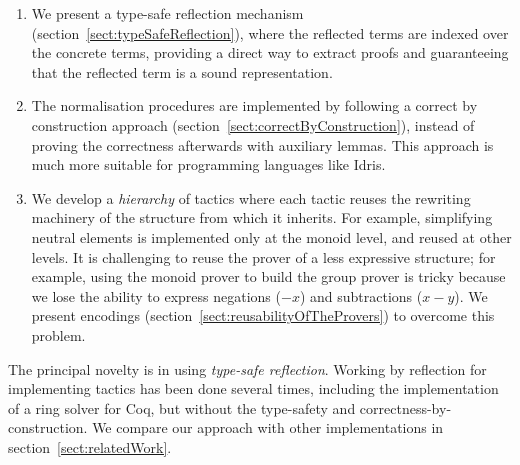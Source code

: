 \begin{enumerate}

\item We present a type-safe reflection mechanism
(section~\ref{sect:typeSafeReflection}), where the reflected terms are indexed
over the concrete terms, providing a direct way to extract proofs and
guaranteeing that the reflected term is a sound representation.

\item The normalisation procedures are implemented by following a correct by
construction approach (section~\ref{sect:correctByConstruction}), instead of proving the correctness afterwards with
auxiliary lemmas. This approach is much more suitable for programming languages
like Idris. 

\item We develop a \emph{hierarchy} of tactics where each tactic reuses the
rewriting machinery of the structure from which it inherits.  For
example, simplifying neutral elements is implemented only at the monoid level,
and reused at other levels.
It is challenging
to reuse the prover of a less expressive structure; for
example, using the monoid prover to build the group prover is 
tricky because
we lose the ability to express negations ($-x$) and
subtractions ($x-y$). We present encodings
(section~\ref{sect:reusabilityOfTheProvers}) to overcome this problem.

\end{enumerate}

The principal novelty is in using 
\emph{type-safe reflection}.  Working by reflection for implementing tactics
has been done several times, including the implementation of a ring solver
for Coq, but without the type-safety and
correctness-by-construction. We compare our approach with other
implementations in section~\ref{sect:relatedWork}.



